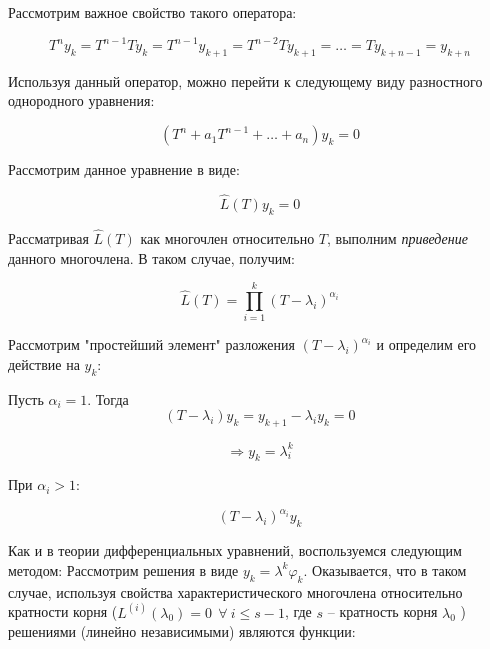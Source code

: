 \documentclass[10pt,a4paper]{article}
\begin{document}
	Рассмотрим важное свойство такого оператора:
	
	\begin{equation}
		T^{n} y_{k} = T^{n - 1}T y_{k} = T^{n - 1}y_{k + 1} = T^{n - 2}Ty_{k + 
		1} = \ldots = T y_{k + n - 1} = y_{k + n}
	\end{equation}
	
	Используя данный оператор, можно перейти к следующему виду разностного 
	однородного уравнения:
	
	\begin{equation}
		\left(T^{n} + a_{1}T^{n - 1} + \ldots + a_{n}\right)y_{k} = 0
	\end{equation}
	
	Рассмотрим данное уравнение в виде:
	
	\begin{equation}
		\hat{L}(T)y_{k} = 0
	\end{equation}
	
	Рассматривая $\hat{L}\left(T\right)$ как многочлен относительно $T$, 
	выполним \textit{приведение} данного многочлена. В таком случае, получим:
	
	\begin{equation}
		\hat{L}\left(T\right) = \prod\limits_{i = 1}^{k}
		\left(T - \lambda_{i}\right)^{\alpha_{i}}
	\end{equation}
	
	Рассмотрим "простейший элемент" разложения $\left(T - \lambda_{i}\right)^{
	\alpha_{i}}$ и определим его действие на $y_{k}$: 
	
	Пусть $\alpha_{i} = 1$. Тогда 
	\begin{equation}
		\left(T - \lambda_{i}\right)y_{k} = y_{k + 1} - \lambda_{i}y_{k} = 0
	\end{equation}
	
	\begin{equation}
		\Rightarrow y_{k} = \lambda_{i}^{k}
	\end{equation}
	
	При $\alpha_{i} > 1$:
	
	\begin{equation}
		\left(T - \lambda_{i}\right)^{\alpha_{i}}y_{k}		
	\end{equation}
	
	Как и в теории дифференциальных уравнений, воспользуемся следующим методом:
	Рассмотрим решения в виде $y_{k} = \lambda^{k}\varphi_{k}$. Оказывается, что 
	в таком случае, используя свойства характеристического многочлена 
	относительно кратности корня ($L^{\left(i\right)}\left(\lambda_{0}\right) = 
	0 \ \ \forall \ i \leqslant s - 1$, где $s$ -- кратность корня $\lambda_{0}$
	) решениями (линейно независимыми) являются функции:
	
\end{document}
